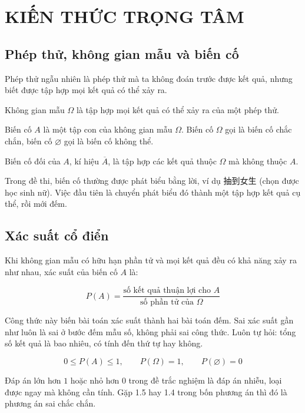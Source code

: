 \documentclass[11pt, a4paper]{article}
\begin{document}
\section{KIẾN THỨC TRỌNG TÂM}

\subsection{Phép thử, không gian mẫu và biến cố}

\begin{dinhnghia}
Phép thử ngẫu nhiên là phép thử mà ta không đoán trước được kết quả, nhưng biết được tập hợp mọi kết quả có thể xảy ra.
\end{dinhnghia}
\begin{dinhnghia}
Không gian mẫu $\Omega$ là tập hợp mọi kết quả có thể xảy ra của một phép thử.
\end{dinhnghia}
\begin{dinhnghia}[{3 — Biến cố}]
Biến cố $A$ là một tập con của không gian mẫu $\Omega$. Biến cố $\Omega$ gọi là biến cố chắc chắn, biến cố $\varnothing$ gọi là biến cố không thể.
\end{dinhnghia}
\begin{dinhnghia}
Biến cố đối của $A$, kí hiệu $\overline{A}$, là tập hợp các kết quả thuộc $\Omega$ mà không thuộc $A$.

 Trong đề thi, biến cố thường được phát biểu bằng lời, ví dụ 抽到女生 (chọn được học sinh nữ). Việc đầu tiên là chuyển phát biểu đó thành một tập hợp kết quả cụ thể, rồi mới đếm.
\end{dinhnghia}
\subsection{Xác suất cổ điển}

\begin{dinhnghia}
Khi không gian mẫu có hữu hạn phần tử và mọi kết quả đều có khả năng xảy ra như nhau, xác suất của biến cố $A$ là:

$$P(A) = \frac{\text{số kết quả thuận lợi cho } A}{\text{số phần tử của } \Omega}$$

 Công thức này biến bài toán xác suất thành hai bài toán đếm. Sai xác suất gần như luôn là sai ở bước đếm mẫu số, không phải sai công thức. Luôn tự hỏi: tổng số kết quả là bao nhiêu, có tính đến thứ tự hay không.
\end{dinhnghia}
\begin{dinhly}
$$0 \le P(A) \le 1, \qquad P(\Omega) = 1, \qquad P(\varnothing) = 0$$

 Đáp án lớn hơn $1$ hoặc nhỏ hơn $0$ trong đề trắc nghiệm là đáp án nhiễu, loại được ngay mà không cần tính. Gặp 1.5 hay 1.4 trong bốn phương án thì đó là phương án sai chắc chắn.
\end{dinhly}
\end{document}

